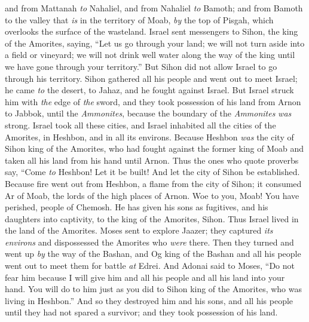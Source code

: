\begin{biblechapter}
\verse and from Mattanah \textit{to} Nahaliel, and from Nahaliel \textit{to} Bamoth;
\verse and from Bamoth to the valley that \textit{is} in the territory of Moab, \textit{by} the top of Pisgah, which overlooks the surface of the wasteland.
 Israel sent messengers to Sihon, the king of the Amorites, saying,
\verse “Let us go through your land; we will not turn aside into a field or vineyard; we will not drink well water along the way of the king until we have gone through your territory.”
\verse But Sihon did not allow Israel to go through his territory. Sihon gathered all his people and went out to meet Israel; he came \textit{to} the desert, to Jahaz, and he fought against Israel.
\verse But Israel struck him with \textit{the} edge of \textit{the} sword, and they took possession of his land from Arnon to Jabbok, until the \textit{Ammonites}, because the boundary of the \textit{Ammonites} \textit{was} strong.
\verse Israel took all these cities, and Israel inhabited all the cities of the Amorites, in Heshbon, and in all its environs.
\verse Because Heshbon \textit{was} the city of Sihon king of the Amorites, who had fought against the former king of Moab and taken all his land from his hand until Arnon.
\verse Thus the ones who quote proverbs say,
\verse “Come \textit{to} Heshbon! Let it be built! 
And let the city of Sihon be established.
\verse Because fire went out from Heshbon, 
a flame from the city of Sihon; 
it consumed Ar of Moab, 
the lords of the high places of Arnon.
\verse Woe to you, Moab! 
You have perished, people of Chemosh. 
He has given his sons as fugitives, 
and his daughters into captivity, 
to the king of the Amorites, Sihon.
\verse Thus Israel lived in the land of the Amorites.
\verse Moses sent to explore Jaazer; they captured \textit{its environs} and dispossessed the Amorites who \textit{were} there.
\verse Then they turned and went up \textit{by} the way of the Bashan, and Og king of the Bashan and all his people went out to meet them for battle \textit{at} Edrei.
\verse And Adonai said to Moses, “Do not fear him because I will give him and all his people and all his land into your hand. You will do to him just as you did to Sihon king of the Amorites, who was living in Heshbon.”
\verse And so they destroyed him and his sons, and all his people until they had not spared a survivor; and they took possession of his land.
\end{biblechapter}

